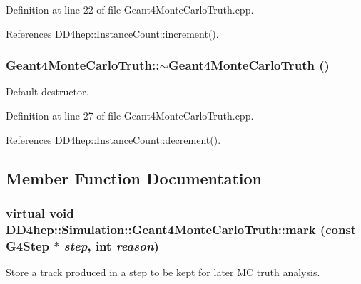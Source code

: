 Definition at line 22 of file Geant4MonteCarloTruth.cpp.

References DD4hep::InstanceCount::increment().\hypertarget{class_d_d4hep_1_1_simulation_1_1_geant4_monte_carlo_truth_acc1f5693c904777e8470b7df290d1c2c}{
\subsubsection[{$\sim$Geant4MonteCarloTruth}]{\setlength{\rightskip}{0pt plus 5cm}Geant4MonteCarloTruth::$\sim$Geant4MonteCarloTruth ()}}
\label{class_d_d4hep_1_1_simulation_1_1_geant4_monte_carlo_truth_acc1f5693c904777e8470b7df290d1c2c}


Default destructor. 

Definition at line 27 of file Geant4MonteCarloTruth.cpp.

References DD4hep::InstanceCount::decrement().

\subsection{Member Function Documentation}
\hypertarget{class_d_d4hep_1_1_simulation_1_1_geant4_monte_carlo_truth_aaa3fb07338363616c0a898d791d24314}{
\subsubsection[{mark}]{\setlength{\rightskip}{0pt plus 5cm}virtual void DD4hep::Simulation::Geant4MonteCarloTruth::mark (const G4Step $\ast$ {\em step}, \/  int {\em reason})}}
\label{class_d_d4hep_1_1_simulation_1_1_geant4_monte_carlo_truth_aaa3fb07338363616c0a898d791d24314}


Store a track produced in a step to be kept for later MC truth analysis. 

